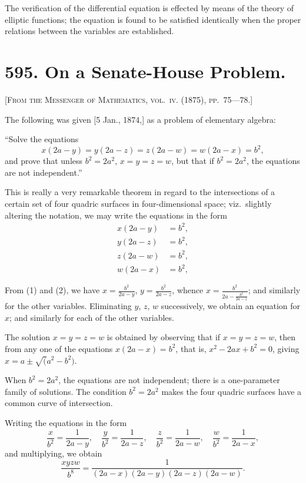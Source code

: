 \documentclass[11pt,a4paper]{book}
\begin{document}
The verification of the differential equation is effected by means of the theory of elliptic functions; the equation is found to be satisfied identically when the proper relations between the variables are established.

\newpage

\section*{595. On a Senate-House Problem.}

\noindent\textsc{[From the Messenger of Mathematics, vol.~\textsc{iv}. (1875), pp.~75---78.]}

\medskip

\noindent The following was given [5 Jan., 1874,] as a problem of elementary algebra:

``Solve the equations
\[
x(2a - y) = y(2a - z) = z(2a - w) = w(2a - x) = b^2,
\]
and prove that unless $b^2 = 2a^2$, $x = y = z = w$, but that if $b^2 = 2a^2$, the equations are not independent.''

This is really a very remarkable theorem in regard to the intersections of a certain set of four quadric surfaces in four-dimensional space; viz.\ slightly altering the notation, we may write the equations in the form
\begin{align*}
x(2a - y) &= b^2, \tag{1} \\
y(2a - z) &= b^2, \tag{2} \\
z(2a - w) &= b^2, \tag{3} \\
w(2a - x) &= b^2, \tag{4}
\end{align*}

From (1) and (2), we have $x = \frac{b^2}{2a - y}$, $y = \frac{b^2}{2a - z}$, whence $x = \frac{b^2}{2a - \frac{b^2}{2a - z}}$; and similarly for the other variables. Eliminating $y$, $z$, $w$ successively, we obtain an equation for $x$; and similarly for each of the other variables.

The solution $x = y = z = w$ is obtained by observing that if $x = y = z = w$, then from any one of the equations $x(2a - x) = b^2$, that is, $x^2 - 2ax + b^2 = 0$, giving $x = a \pm \surd(a^2 - b^2)$.

When $b^2 = 2a^2$, the equations are not independent; there is a one-parameter family of solutions. The condition $b^2 = 2a^2$ makes the four quadric surfaces have a common curve of intersection.

Writing the equations in the form
\[
\frac{x}{b^2} = \frac{1}{2a - y},\quad \frac{y}{b^2} = \frac{1}{2a - z},\quad \frac{z}{b^2} = \frac{1}{2a - w},\quad \frac{w}{b^2} = \frac{1}{2a - x},
\]
and multiplying, we obtain
\[
\frac{xyzw}{b^8} = \frac{1}{(2a - x)(2a - y)(2a - z)(2a - w)}.
\]
\end{document}

